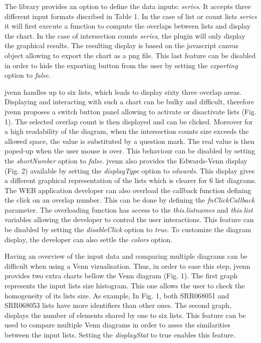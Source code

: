 \documentclass{bmcart}
\begin{document}
The library provides an option to define the data inputs: \textit{series}. It accepts three different input formats discribed in 
Table 1. In the case of list or count lists \textit{series} it will first execute a function to compute the overlaps between lists and
display the chart. In the case of intersection counts \textit{series}, the plugin will only display the graphical results. The resulting 
display is based on the javascript canvas object allowing to export the chart as a png file. This last feature can be disabled in order 
to hide the exporting button from the user by setting the \textit{exporting} option to \textit{false}.

jvenn handles up to six lists, which leads to display sixty three overlap areas. Displaying and interacting with such a chart
can be bulky and difficult, therefore jvenn proposes a switch button panel allowing to activate or disactivate lists (Fig. 1). The selected 
overlap count is then displayed and can be clicked. Moreover for a high readability of the diagram, when the intersection counts size exceeds
the allowed space, the value is substituted by a question mark. The real value is then poped-up when the user mouse is over. This behaviour 
can be disabled by setting the \textit{shortNumber} option to \textit{false}. jvenn also provides the Edwards-Venn display (Fig. 2) available 
by setting the \textit{displayType} option to \textit{edwards}. This display gives a different graphical representation of the lists which is 
clearer for 6 list diagrams. The WEB application developer can also overload the callback function defining the click on an overlap number. 
This can be done by defining the \textit{fnClickCallback} parameter. The overloading function has access to the \textit{this.listnames} and
\textit{this.list} variables allowing the developer to control the user interactions. This feature can be disabled by setting the 
\textit{disableClick} option to \textit{true}. To customize the diagram display, the developer can also settle the \textit{colors} option.

Having an overview of the input data and comparing multiple diagrams can be difficult when using a Venn vizualisation. Thus, in order to ease 
this step, jvenn provides two extra charts bellow the Venn diagram (Fig. 1). The first graph represents the input lists size histogram. This one
allows the user to check the homogeneity of its lists size. As example, In Fig. 1, both SRR068051 and SRR068053 lists have more identifiers than 
other ones. The second graph, displays the number of elements shared by one to six lists. This feature can be used to compare multiple Venn 
diagrams in order to asses the similarities between the input lists. Setting the \textit{displayStat} to true enables this feature.
\end{document}
